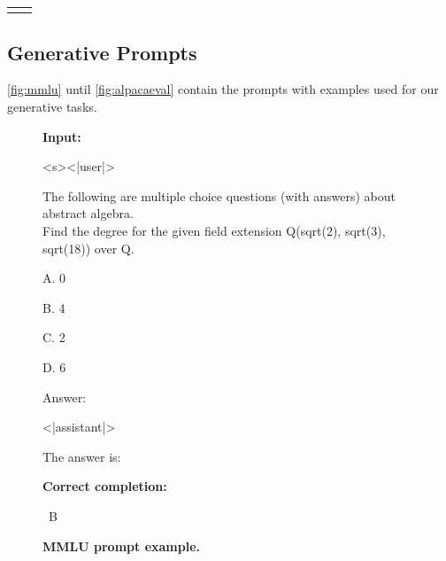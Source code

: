 \documentclass{article}
\begin{document}
\begin{longtable}{lp{9cm}}
\bottomrule
\label{tab:medi2fewshots}
\end{longtable}


\subsection{Generative Prompts}
\label{sec:promptsgen}

\autoref{fig:mmlu} until \autoref{fig:alpacaeval} contain the prompts with examples used for our generative tasks.

\begin{figure}[htbp]
\hrulefill

\textbf{Input:}

\hrulefill

<s><|user|>

The following are multiple choice questions (with answers) about  abstract algebra. \\

Find the degree for the given field extension Q(sqrt(2), sqrt(3), sqrt(18)) over Q.

A. 0

B. 4

C. 2

D. 6

Answer:

<|assistant|>

The answer is:

\hrulefill

\textbf{Correct completion:}

\hrulefill

~B

\hrulefill

\caption{\textbf{MMLU prompt example.}}
\label{fig:mmlu}
\end{figure}
\end{document}
